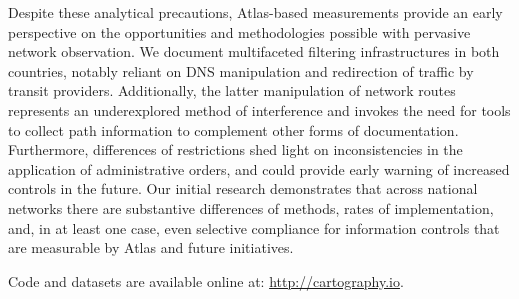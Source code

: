 Despite these analytical precautions, Atlas-based measurements provide
an early perspective on the opportunities and methodologies possible
with pervasive network observation. We document multifaceted filtering
infrastructures in both countries, notably reliant on DNS manipulation
and redirection of traffic by transit providers. Additionally, the
latter manipulation of network routes represents an underexplored method
of interference and invokes the need for tools to collect path
information to complement other forms of documentation. Furthermore,
differences of restrictions shed light on  inconsistencies in the
application of administrative orders, and could provide early warning of
increased controls in the future. Our initial research demonstrates that
across national networks there are substantive differences of methods,
rates of implementation, and, in at least one case, even selective
compliance for information controls that are measurable by Atlas and
future initiatives.

Code and datasets are available online at: \url{http://cartography.io}.
